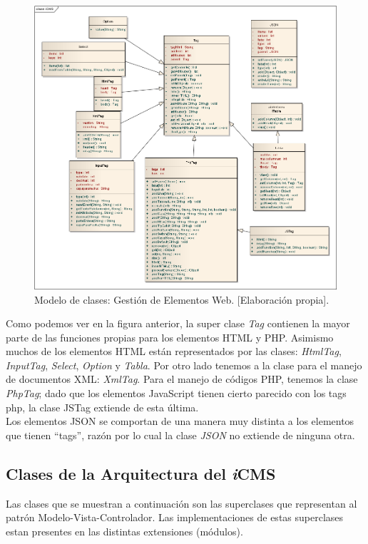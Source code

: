 \begin{figure}[h]
\centering
\includegraphics[scale=.4, keepaspectratio=true]{imagenes/08_imagen.png}
\caption{Modelo de clases: Gesti\'on de Elementos Web. [Elaboraci\'on propia].}
\end{figure}

Como podemos ver en la figura anterior, la super clase \emph{Tag} contienen la mayor parte de las funciones propias para los elementos HTML y PHP. Asimismo muchos de los elementos HTML est\'an representados por las clases: \emph{HtmlTag}, \emph{InputTag}, \emph{Select}, \emph{Option} y \emph{Tabla}. Por otro lado tenemos a la clase para el manejo de documentos XML: \emph{XmlTag}. Para el manejo de c\'odigos PHP, tenemos la clase \emph{PhpTag}; dado que los elementos JavaScript tienen cierto parecido con los tags php, la clase JSTag extiende de esta \'ultima.\\
Los elementos JSON se comportan de una manera muy distinta a los elementos que tienen ``tags'', raz\'on por lo cual la clase \emph{JSON} no extiende de ninguna otra.

\subsection{Clases de la Arquitectura del \textit{i}CMS}
Las clases que se muestran a continuaci\'on son las superclases que representan al patr\'on Modelo-Vista-Controlador. Las implementaciones de estas superclases estan presentes en las distintas extensiones (m\'odulos).\\

